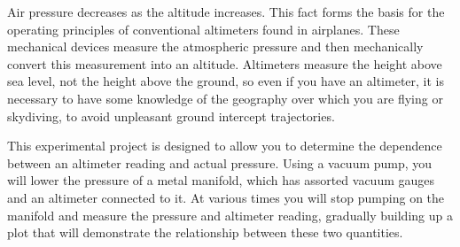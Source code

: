 Air pressure decreases as the altitude increases. This fact forms the basis for the operating principles of conventional altimeters found in airplanes. These mechanical devices measure the atmospheric pressure and then mechanically convert this measurement into an altitude. Altimeters measure the height above sea level, not the height above the ground, so even if you have an altimeter, it is necessary to have some knowledge of the geography over which you are flying or skydiving, to avoid unpleasant ground intercept trajectories.

This experimental project is designed to allow you to determine the dependence between an altimeter reading and actual pressure. Using a vacuum pump, you will lower the pressure of a metal manifold, which has assorted vacuum gauges and an altimeter connected to it. At various times you will stop pumping on the manifold and measure the pressure and altimeter reading, gradually building up a plot that will demonstrate the relationship between these two quantities. 

